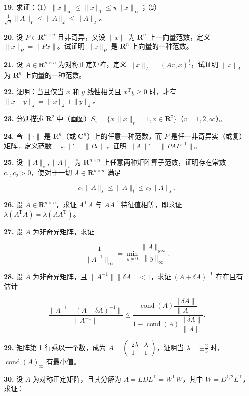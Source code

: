 \documentclass[
  10pt,
  fontset=fandol]{ctexart}
\begin{document}
\textbf{19.}
求证：（1）\(\|x\|_\infty\leqslant\|x\|_1\leqslant n\|x\|_\infty\)；（2）\(\frac1{\sqrt n}\|A\|_F\leqslant\|A\|_2\leqslant\|A\|_F\)。

\textbf{20.} 设 \(P\in\mathbf R^{n\times n}\) 且非奇异，又设 \(\|x\|\)
为 \(\mathbf R^n\) 上一向量范数，定义 \(\|x\|_P=\|Px\|\)。试证明
\(\|x\|_P\) 是 \(\mathbf R^n\) 上向量的一种范数。

\textbf{21.} 设 \(A\in\mathbf R^{n\times n}\) 为对称正定矩阵，定义
\(\|x\|_A=(Ax,x)^{\frac12}\)，试证明 \(\|x\|_A\) 为 \(\mathbf R^n\)
上向量的一种范数。

\textbf{22.} 证明：当且仅当 \(x\) 和 \(y\) 线性相关且
\(x^{\mathrm T}y\geqslant0\) 时，才有 \(\|x+y\|_2=\|x\|_2+\|y\|_2\)。

\textbf{23.} 分别描述 \(\mathbf R^2\)
中（画图）\(S_v=\{x\mid\|x\|_v=1,x\in\mathbf R^2\}\)（\(v=1,2,\infty\)）。

\textbf{24.} 令 \(\|\cdot\|\) 是 \(\mathbf R^n\)（或
\(\mathbf C^n\)）上的任意一种范数，而 \(P\)
是任一非奇异实（或复）矩阵，定义范数 \(\|x\|'=\|Px\|\)，证明
\(\|A\|'=\|PAP^{-1}\|\)。

\textbf{25.} 设 \(\|A\|_s,\|A\|_t\) 为 \(\mathbf R^{n\times n}\)
上任意两种矩阵算子范数，证明存在常数 \(c_1,c_2>0\)，使对于一切
\(A\in\mathbf R^{n\times n}\) 满足

\[
c_1\|A\|_s\leqslant\|A\|_t\leqslant c_2\|A\|_s.
\]

\textbf{26.} 设 \(A\in\mathbf R^{n\times n}\)，求证 \(A^{\mathrm T}A\)
与 \(AA^{\mathrm T}\) 特征值相等，即求证
\(\lambda(A^{\mathrm T}A)=\lambda(AA^{\mathrm T})\)。

\textbf{27.} 设 \(A\) 为非奇异矩阵，求证

\[
\frac1{\|A^{-1}\|_\infty}=\min_{y\neq0}\frac{\|A\|_{y\infty}}{\|y\|_\infty}.
\]

\textbf{28.} 设 \(A\) 为非奇异矩阵，且
\(\|A^{-1}\|\|\delta A\|<1\)，求证 \((A+\delta A)^{-1}\) 存在且有估计

\[
\frac{\|A^{-1}-(A+\delta A)^{-1}\|}{\|A^{-1}\|}
\leqslant
\frac{\operatorname{cond}(A)\dfrac{\|\delta A\|}{\|A\|}}
{1-\operatorname{cond}(A)\dfrac{\|\delta A\|}{\|A\|}}.
\]

\textbf{29.} 矩阵第 1 行乘以一个数，成为
\(A=\begin{pmatrix}2\lambda&\lambda\\1&1\end{pmatrix}\)，证明当
\(\lambda=\pm\frac23\) 时，\(\operatorname{cond}(A)_\infty\) 有最小值。

\textbf{30.} 设 \(A\) 为对称正定矩阵，且其分解为
\(A=LDL^{\mathrm T}=W^{\mathrm T}W\)，其中
\(W=D^{1/2}L^{\mathrm T}\)，求证：
\end{document}
